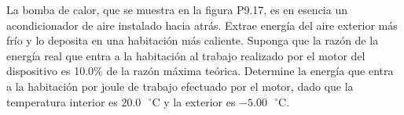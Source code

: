 \item La bomba de calor, que se muestra en la figura P9.17, es en esencia un acondicionador de aire instalado hacia atrás. Extrae energía del aire exterior más frío y lo deposita en una habitación más caliente. Suponga que la razón de la energía real que entra a la habitación al trabajo realizado por el motor del dispositivo es 10.0\% de la razón máxima teórica. Determine la energía que entra a la habitación por joule de trabajo efectuado por el motor, dado que la temperatura interior es $20.0\text{ }^\circ\text{C}$ y la exterior es $-5.00\text{ }^\circ\text{C}$.
